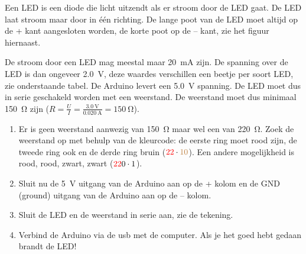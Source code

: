\documentclass{arduino}
\begin{document}
Een LED is een diode die licht uitzendt als er stroom door de LED gaat. De LED laat stroom maar door in één richting. De lange poot van de LED moet altijd op de + kant aangesloten worden, de korte poot op de – kant, zie het figuur hiernaast.

De stroom door een LED mag meestal maar \SI{20}{\milli\ampere} zijn. De spanning over de LED is dan ongeveer \SI{2.0}{\volt}, deze waardes verschillen een beetje per soort LED, zie onderstaande tabel. De Arduino levert een \SI{5.0}{\volt} spanning. De LED moet dus in serie geschakeld worden met een weerstand. De weerstand moet dus minimaal \SI{150}{\ohm} zijn ($R = \frac{U}{I} = \frac{\SI{3.0}{\volt}}{\SI{0.020}{\ampere}} = \SI{150}{\ohm}$).


\begin{enumerate}
\item Er is geen weerstand aanwezig van \SI{150}{\ohm} maar wel een van \SI{220}{\ohm}. Zoek de weerstand op met behulp van de kleurcode: de eerste ring moet rood zijn, de tweede ring ook en de derde ring bruin ($\textcolor{red}{2}\textcolor{red}{2} \cdot \textcolor{brown}{10}$). Een andere mogelijkheid is rood, rood, zwart, zwart ($\textcolor{red}{2}\textcolor{red}{2}\textcolor{black}{0} \cdot \textcolor{black}{1}$).

\item Sluit nu de \SI{5}{\volt} uitgang van de Arduino aan op de + kolom en de GND (ground) uitgang van de Arduino aan op de – kolom.

\item Sluit de LED en de weerstand in serie aan, zie de tekening.

\item Verbind de Arduino via de usb met de computer. Als je het goed hebt gedaan brandt de LED!
\end{enumerate}
\end{document}
